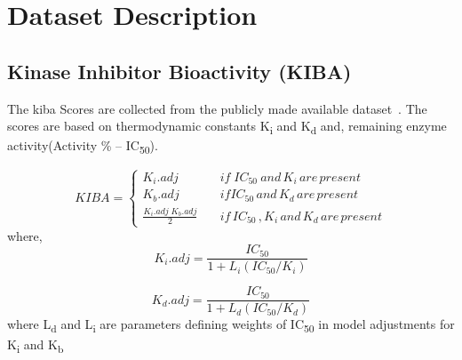 \section{Dataset Description}

\subsection{Kinase Inhibitor Bioactivity (KIBA)}
The \acrfull{kiba} Scores are collected from the publicly made available dataset~\citep{Tang2013}. The scores are based on thermodynamic constants K\textsubscript{i} and K\textsubscript{d} and, remaining enzyme activity(Activity \% --  IC\textsubscript{50}).

\begin{equation}
  KIBA = \begin{cases}
    K_i . {adj} & \quad {if} \; {IC_{50}\: and\, K_i \,are\, present} \\
    K_b.{adj} & \quad {if}  {IC_{50} \, and \, K_d \, are \, present} \\
    \frac{K_i . {adj} \; K_b.{adj}}{2} & \quad {if\, IC_{50}\,,K_i\, and \,K_d\, are\, present}
  \end{cases}
   \label{eq:kiba}
\end{equation}
where,
\begin{equation}
K_i.{adj} = \frac{IC_{50}}{1 + L_i(IC_{50}/K_i)}
\label{eq:ki_adj}
\end{equation}

\begin{equation}
K_d.{adj} = \frac{IC_{50}}{1 + L_d(IC_{50}/K_d)}
\end{equation}
where L\textsubscript{d} and L\textsubscript{i} are parameters defining weights of IC\textsubscript{50} in model adjustments for K\textsubscript{i} and K\textsubscript{b} 

